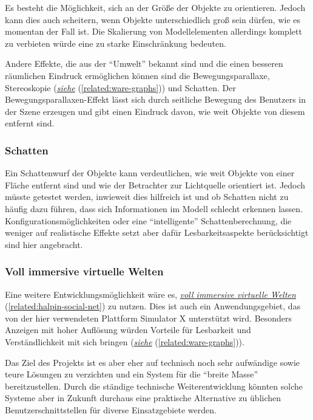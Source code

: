 \documentclass[a4paper,10pt]{sphinxmanual}
\begin{document}
Es besteht die Möglichkeit, sich an der Größe der Objekte zu orientieren. Jedoch kann dies auch scheitern, wenn Objekte unterschiedlich groß sein dürfen, wie es momentan der Fall ist.
Die Skalierung von Modellelementen allerdings komplett zu verbieten würde eine zu starke Einschränkung bedeuten.

Andere Effekte, die aus der "`Umwelt"' bekannt sind und die einen besseren räumlichen Eindruck ermöglichen können sind die Bewegungsparallaxe, Stereoskopie ({\hyperref[related:ware-graphs]{\emph{siehe}}} (\autoref*{related:ware-graphs})) und Schatten.
Der Bewegungsparallaxen-Effekt lässt sich durch seitliche Bewegung des Benutzers in der Szene erzeugen und gibt einen Eindruck davon, wie weit Objekte von diesem entfernt sind.


\subsubsection{Schatten}
\label{visualisierung:schatten}
Ein Schattenwurf der Objekte kann verdeutlichen, wie weit Objekte von einer Fläche entfernt sind und wie der Betrachter zur Lichtquelle orientiert ist.
Jedoch müsste getestet werden, inwieweit dies hilfreich ist und ob Schatten nicht zu häufig dazu führen, dass sich Informationen im Modell schlecht erkennen lassen.
Konfigurationsmöglichkeiten oder eine "`intelligente"' Schattenberechnung, die weniger auf realistische Effekte setzt aber dafür Lesbarkeitsaspekte berücksichtigt sind hier angebracht.


\subsubsection{Voll immersive virtuelle Welten}
\label{visualisierung:voll-immersive-virtuelle-welten}
Eine weitere Entwicklungsmöglichkeit wäre es, {\hyperref[related:halpin-social-net]{\emph{voll immersive virtuelle Welten}}} (\autoref*{related:halpin-social-net}) zu nutzen.
Dies ist auch ein Anwendungsgebiet, das von der hier verwendeten Plattform Simulator X unterstützt wird.
Besonders Anzeigen mit hoher Auflösung würden Vorteile für Lesbarkeit und Verständlichkeit mit sich bringen ({\hyperref[related:ware-graphs]{\emph{siehe}}} (\autoref*{related:ware-graphs})).

Das Ziel des Projekts ist es aber eher auf technisch noch sehr aufwändige sowie teure Lösungen zu verzichten und ein System für die "`breite Masse"' bereitzustellen.
Durch die ständige technische Weiterentwicklung könnten solche Systeme aber in Zukunft durchaus eine praktische Alternative zu üblichen Benutzerschnittstellen für diverse Einsatzgebiete werden.
\end{document}
